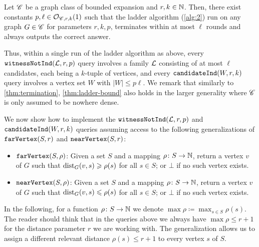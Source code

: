 \begin{theorem}\label{thm:ladder-bound}
	Let $\Cc$ be a graph class of bounded expansion and $r,k\in \N$. Then, there exist constants $p,\ell\in \Oh_{\Cc,r,k}(1)$ such that the ladder algorithm (\cref{alg:2}) run on any graph $G\in \Cc$ for parameters $r,k,p$, terminates within at most $\ell$ rounds and always outputs the correct answer. 
\end{theorem}

Thus, within a single run of the ladder algorithm as above, every $\witnessInd{\cal L,r,p}$ query involves a family $\cal L$ consisting of at most $\ell$ candidates, each being a $k$-tuple of vertices, and every $\candidateInd{W,r,k}$ query involves a vertex set $W$ with $|W|\leq p\ell$. We remark that similarly to \cref{thm:termination}, \cref{thm:ladder-bound} also holds in the larger generality where $\Cc$ is only assumed to be nowhere dense.

We now show how to implement the $\witnessInd{\cal L,r,p}$ and $\candidateInd{W,r,k}$ queries assuming access to the following generalizations of $\far{S,r}$ and $\near{S,r}$:
\begin{itemize}
	\item $\far{S,\rho}$: Given a set $S$ and a mapping $\rho\colon S\to \N$, return a vertex $v$ of $G$ such that $\dist_G(v,s)\geq\rho(s)$ for all $s\in S$; or $\bot$ if no such vertex exists.
	\item $\near{S,\rho}$: Given a set $S$ and a mapping $\rho\colon S\to \N$, return a vertex $v$ of $G$ such that $\dist_G(v,s)\leq \rho(s)$ for all $s\in S$; or $\bot$ if no such vertex exists.
\end{itemize}
In the following, for a function $\rho\colon S\to \N$ we denote $\max \rho\coloneqq \max_{s\in S} \rho(s)$. The reader should think that in the queries above we always have $\max \rho \leq r+1$ for the distance parameter $r$ we are working with. The generalization allows us to assign a different relevant distance $\rho(s)\leq r+1$ to every vertex $s$ of $S$.

